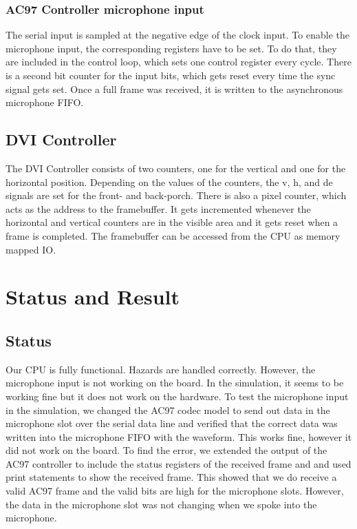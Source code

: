 \documentclass[12pt]{article}
\begin{document}
\subsubsection{AC97 Controller microphone input}
The serial input is sampled at the negative edge of the clock input. To enable the microphone input, the corresponding registers have to be set. To do that, they are included in the control loop, which sets one control register every cycle. There is a second bit counter for the input bits, which gets reset every time the sync signal gets set. Once a full frame was received, it is written to the asynchronous microphone FIFO.

\subsection{DVI Controller}
The DVI Controller consists of two counters, one for the vertical and one for the horizontal position. Depending on the values of the counters, the v, h, and de signals are set for the front- and back-porch. There is also a pixel counter, which acts as the address to the framebuffer. It gets incremented whenever the horizontal and vertical counters are in the visible area and it gets reset when a frame is completed.
The framebuffer can be accessed from the CPU as memory mapped IO.


\section{Status and Result}
\subsection{Status}
Our CPU is fully functional. Hazards are handled correctly. However, the microphone input is not working on the board. In the simulation, it seems to be working fine but it does not work on the hardware. To test the microphone input in the simulation, we changed the AC97 codec model to send out data in the microphone slot over the serial data line and verified that the correct data was written into the microphone FIFO with the waveform. This works fine, however it did not work on the board. To find the error, we extended the output of the AC97 controller to include the status registers of the received frame and and used print statements to show the received frame. This showed that we do receive a valid AC97 frame and the valid bits are high for the microphone slots. However, the data in the microphone slot was not changing when we spoke into the microphone.
\end{document}
